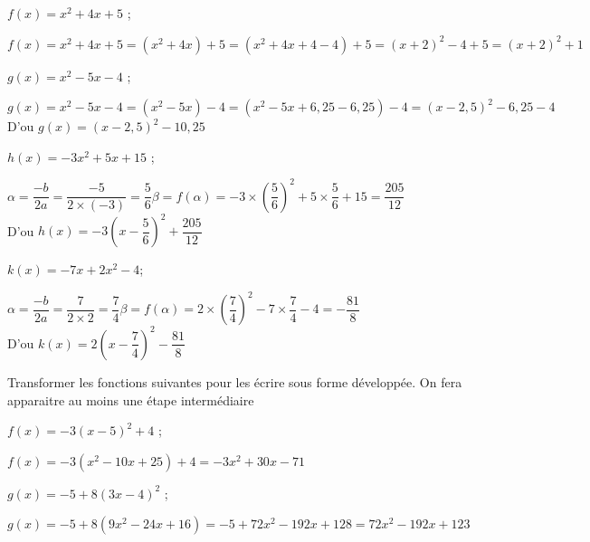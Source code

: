 \documentclass[11pt,a4paper]{article}  %
\begin{document}
    \begin{enumMet}
        \item $f(x)=x^2+4x+5$ ; \quad {}
        \begin{corrBox}
        	$f(x)=x^2+4x+5=(x^2+4x)+5=(x^2+4x+4-4)+5=(x+2)^2-4+5=(x+2)^2+1$
        \end{corrBox}
        \item  $g(x)=x^2-5x-4$ ; \quad {}
         \begin{corrBox}
        	$g(x)=x^2-5x-4=(x^2-5x)-4=(x^2-5x+6,25-6,25)-4=(x-2,5)^2-6,25-4$\\
        	D'ou $g(x)=(x-2,5)^2-10,25$
        \end{corrBox}
        \item $h(x)=-3x^2+5x+15$ ; \quad {}
         \begin{corrBox}
        	$\alpha=\dfrac{-b}{2a}=\dfrac{-5}{2\times (-3)}=\dfrac{5}{6}$\quad \quad\quad \quad $\beta=f(\alpha)=-3\times \left(\dfrac{5}{6}\right)^2+5\times \dfrac{5}{6}+15=\dfrac{205}{12}$\\
        	D'ou $h(x)=-3\left(x-\dfrac{5}{6}\right)^2+\dfrac{205}{12}$
        \end{corrBox}
        \item $k(x)=-7x+2x^2-4$; \quad {}
         \begin{corrBox}
         	$\alpha=\dfrac{-b}{2a}=\dfrac{7}{2\times 2}=\dfrac{7}{4}$\quad \quad\quad \quad $\beta=f(\alpha)=2\times \left(\dfrac{7}{4}\right)^2-7\times \dfrac{7}{4}-4=-\dfrac{81}{8}$\\
         	D'ou $k(x)=2\left(x-\dfrac{7}{4}\right)^2-\dfrac{81}{8}$
         \end{corrBox}
    \end{enumMet}
\vspace*{-0.3cm}
Transformer les fonctions suivantes pour les écrire sous forme développée. On fera apparaitre au moins une étape intermédiaire
	\begin{enumMet}
		\item $f(x)=-3(x-5)^2+4$ ; \quad {}
		\begin{corrBox}
			$f(x)=-3(x^2-10x+25)+4=-3x^2+30x-71$
		\end{corrBox}
		\item $g(x)=-5+8(3x-4)^2$ ; \quad {}
		\begin{corrBox}
			$g(x)=-5+8(9x^2-24x+16)=-5+72x^2-192x+128=72x^2-192x+123$
		\end{corrBox}
	\end{enumMet}
\end{document}

